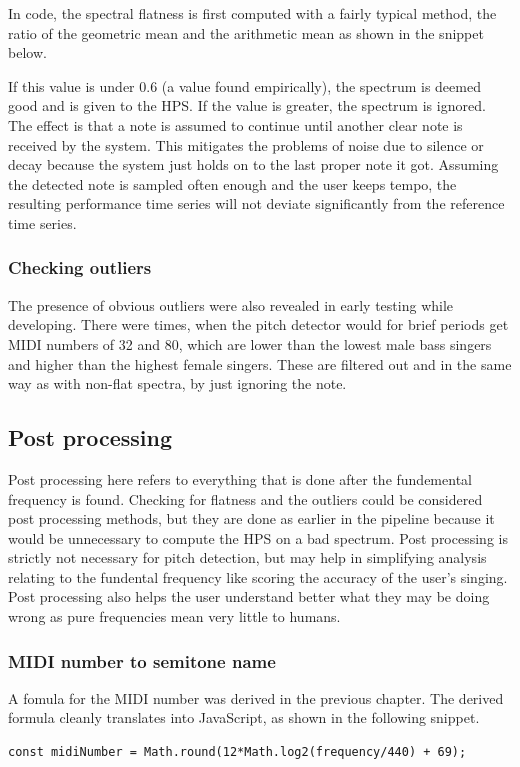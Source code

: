 In code, the spectral flatness is first computed with a fairly typical method, the ratio of the geometric mean and the arithmetic mean as shown in the snippet below.

If this value is under $0.6$ (a value found empirically), the spectrum is deemed good and is given to the HPS. If the value is greater, the spectrum is ignored. The effect is that a note is assumed to continue until another clear note is received by the system. This mitigates the problems of noise due to silence or decay because the system just holds on to the last proper note it got. Assuming the detected note is sampled often enough and the user keeps tempo, the resulting performance time series will not deviate significantly from the reference time series.

\subsubsection{Checking outliers}
The presence of obvious outliers were also revealed in early testing while developing. There were times, when the pitch detector would for brief periods get MIDI numbers of 32 and 80, which are lower than the lowest male bass singers and higher than the highest female singers. These are filtered out and in the same way as with non-flat spectra, by just ignoring the note. 

\subsection{Post processing}
Post processing here refers to everything that is done after the fundemental frequency is found. Checking for flatness and the outliers could be considered post processing methods, but they are done as earlier in the pipeline because it would be unnecessary to compute the HPS on a bad spectrum. Post processing is strictly not necessary for pitch detection, but may help in simplifying analysis relating to the fundental frequency like scoring the accuracy of the user's singing. Post processing also helps the user understand better what they may be doing wrong as pure frequencies mean very little to humans. 

\subsubsection{MIDI number to semitone name}
A fomula for the MIDI number was derived in the previous chapter. The derived formula cleanly translates into JavaScript, as shown in the following snippet.
\begin{lstlisting}[style=javascript]
    const midiNumber = Math.round(12*Math.log2(frequency/440) + 69);
\end{lstlisting}

